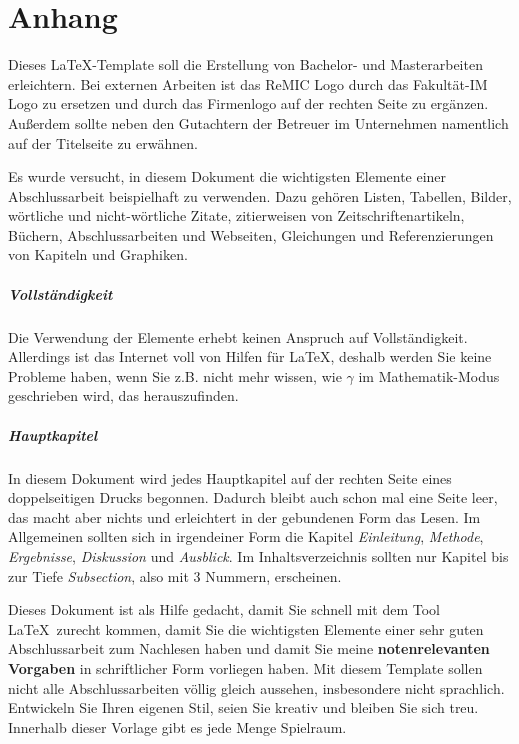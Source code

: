 
\appendix


\chapter{Anhang}
\label{anhang}

Dieses \LaTeX-Template soll die Erstellung von Bachelor- und Masterarbeiten erleichtern.
Bei externen Arbeiten ist das ReMIC Logo durch das Fakultät-IM Logo zu ersetzen und durch das Firmenlogo auf der rechten Seite zu ergänzen.
Außerdem sollte neben den Gutachtern der Betreuer im Unternehmen namentlich auf der Titelseite zu erwähnen.

Es wurde versucht, in diesem Dokument die wichtigsten Elemente einer Abschlussarbeit beispielhaft zu verwenden.
Dazu gehören Listen, Tabellen, Bilder, wörtliche und nicht-wörtliche Zitate, zitierweisen von Zeitschriftenartikeln, Büchern, Abschlussarbeiten und Webseiten, Gleichungen und Referenzierungen von Kapiteln und Graphiken.

\paragraph{Vollständigkeit}
Die Verwendung der Elemente erhebt keinen Anspruch auf Vollständigkeit.
Allerdings ist das Internet voll von Hilfen für \LaTeX, deshalb werden Sie keine Probleme haben, wenn Sie z.B. nicht mehr wissen, wie $\gamma$ im Mathematik-Modus geschrieben wird, das herauszufinden.

\paragraph{Hauptkapitel}
In diesem Dokument wird jedes Hauptkapitel auf der rechten Seite eines doppelseitigen Drucks begonnen.
Dadurch bleibt auch schon mal eine Seite leer, das macht aber nichts und erleichtert in der gebundenen Form das Lesen.
Im Allgemeinen sollten sich in irgendeiner Form die Kapitel \emph{ Einleitung}, \emph{Methode}, \emph{Ergebnisse}, \emph{Diskussion} und \emph{ Ausblick}.
Im Inhaltsverzeichnis sollten nur Kapitel bis zur Tiefe \emph{ Subsection}, also mit 3 Nummern, erscheinen.

Dieses Dokument ist als Hilfe gedacht, damit Sie schnell mit dem Tool \LaTeX~zurecht kommen,
damit Sie die wichtigsten Elemente einer sehr guten Abschlussarbeit zum Nachlesen haben und damit Sie meine \textbf{notenrelevanten Vorgaben} in schriftlicher Form vorliegen haben.
Mit diesem Template sollen nicht alle Abschlussarbeiten völlig gleich aussehen, insbesondere nicht sprachlich.
Entwickeln Sie Ihren eigenen Stil, seien Sie kreativ und bleiben Sie sich treu. Innerhalb dieser Vorlage gibt es jede Menge Spielraum.



